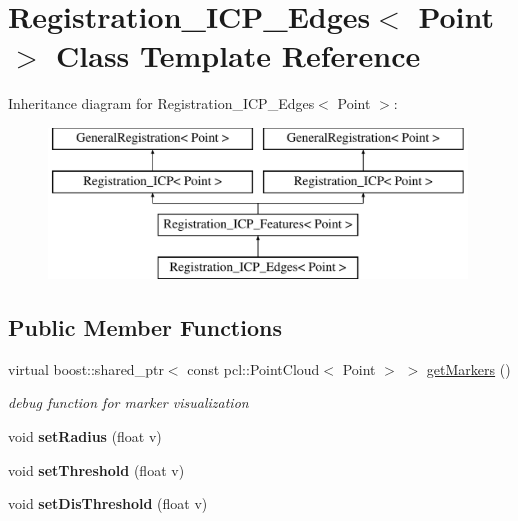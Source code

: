 \hypertarget{classRegistration__ICP__Edges}{
\section{Registration\_\-ICP\_\-Edges$<$ Point $>$ Class Template Reference}
\label{classRegistration__ICP__Edges}
}
Inheritance diagram for Registration\_\-ICP\_\-Edges$<$ Point $>$:\begin{figure}[H]
\begin{center}
\leavevmode
\includegraphics[height=4.000000cm]{classRegistration__ICP__Edges}
\end{center}
\end{figure}
\subsection*{Public Member Functions}
\begin{DoxyCompactItemize}
\item 
\hypertarget{classRegistration__ICP__Edges_a8b3d6bbb4e57f46c90c296545dcc51d0}{
virtual boost::shared\_\-ptr$<$ const pcl::PointCloud$<$ Point $>$ $>$ \hyperlink{classRegistration__ICP__Edges_a8b3d6bbb4e57f46c90c296545dcc51d0}{getMarkers} ()}
\label{classRegistration__ICP__Edges_a8b3d6bbb4e57f46c90c296545dcc51d0}

\begin{DoxyCompactList}\small\item\em debug function for marker visualization \item\end{DoxyCompactList}\item 
\hypertarget{classRegistration__ICP__Edges_a36d5d5fe3955b11e81610496147e2159}{
void {\bfseries setRadius} (float v)}
\label{classRegistration__ICP__Edges_a36d5d5fe3955b11e81610496147e2159}

\item 
\hypertarget{classRegistration__ICP__Edges_a4d108ccdabc085bf79d45ac9659d84e1}{
void {\bfseries setThreshold} (float v)}
\label{classRegistration__ICP__Edges_a4d108ccdabc085bf79d45ac9659d84e1}

\item 
\hypertarget{classRegistration__ICP__Edges_aad7c241aec15cb5f7543673ca47db8ea}{
void {\bfseries setDisThreshold} (float v)}
\label{classRegistration__ICP__Edges_aad7c241aec15cb5f7543673ca47db8ea}

\end{DoxyCompactItemize}
